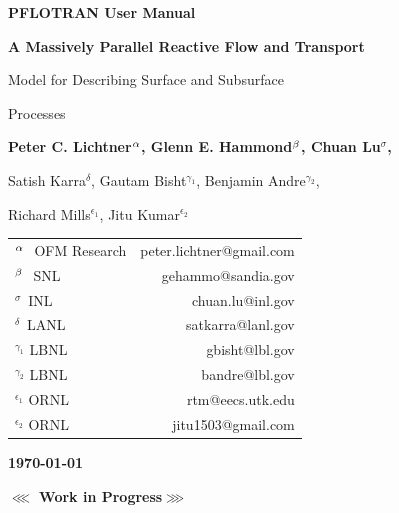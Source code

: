 \begin{center}

\dblline


{\bf\huge PFLOTRAN User Manual}

\vspace{0.5cm}

{\bf\LARGE A Massively Parallel Reactive Flow and Transport 

Model for Describing Surface and Subsurface 

Processes}

\vspace{0.5cm}

{\bf\large Peter C. Lichtner${^{\alpha}}$, Glenn E. Hammond${^{\beta}}$, Chuan Lu${^\sigma}$, 

Satish Karra${^\delta}$, Gautam Bisht$^{\gamma_1}$, Benjamin Andre$^{\gamma_2}$, 

Richard Mills$^{\epsilon_1}$, Jitu Kumar$^{\epsilon_2}$}

\vspace{0.5cm}

\begin{tabular}{lr}
$^{{\alpha}_{~}}$ OFM Research & peter.lichtner@gmail.com\\
$^{{\beta}_{~}}$ SNL & gehammo@sandia.gov\\
$^{\sigma_{~}}$ INL & chuan.lu@inl.gov\\
$^{\delta_{~}}$ LANL & satkarra@lanl.gov\\
$^{\gamma_1^{}}$ LBNL & gbisht@lbl.gov\\
$^{\gamma_2^{}}$ LBNL & bandre@lbl.gov\\
$^{\epsilon_1^{}}$ ORNL & rtm@eecs.utk.edu \\
$^{\epsilon_2^{}}$ ORNL & jitu1503@gmail.com
\end{tabular}

\vspace{0.5cm}

{\bf\large\today}


\vspace{1cm}

{\bf\LARGE $\lll$ Work in Progress$\ggg$}

\vspace{1cm}

\end{center}

